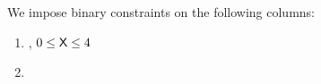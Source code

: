 We impose binary constraints on the following columns:
\begin{multicols}{2}
\begin{enumerate}
\item {}, $0 \leq \textsf{X} \leq 4$
\item \txEmitsLogs
\end{enumerate}
\end{multicols}
